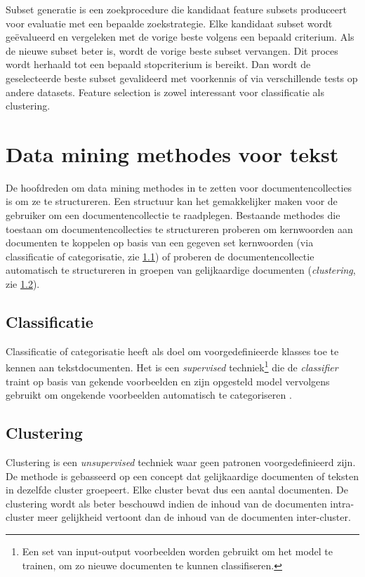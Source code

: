 Subset generatie is een zoekprocedure die kandidaat feature subsets produceert voor evaluatie met een bepaalde zoekstrategie. Elke kandidaat subset wordt ge\"evalueerd en vergeleken met de vorige beste volgens een bepaald criterium. Als de nieuwe subset beter is, wordt de vorige beste subset vervangen. Dit proces wordt herhaald tot een bepaald stopcriterium is bereikt. Dan wordt de geselecteerde beste subset gevalideerd met voorkennis of via verschillende tests op andere datasets. Feature selection is zowel interessant voor classificatie als clustering. 


\section{Data mining methodes voor tekst}
De hoofdreden om data mining methodes in te zetten voor documentencollecties is om ze te structureren. Een structuur kan het gemakkelijker maken voor de gebruiker om een documentencollectie te raadplegen. Bestaande methodes die toestaan om documentencollecties te structureren proberen om kernwoorden aan documenten te koppelen op basis van een gegeven set kernwoorden (via classificatie of categorisatie, zie \ref{classificatie}) of proberen de documentencollectie automatisch te structureren in groepen van gelijkaardige documenten (\textit{clustering}, zie \ref{clustering}).


\subsection{Classificatie}\label{classificatie}
Classificatie of categorisatie heeft als doel om voorgedefinieerde klasses toe te kennen aan tekstdocumenten. Het is een \textit{supervised} techniek\footnote{Een set van input-output voorbeelden worden gebruikt om het model te trainen, om zo nieuwe documenten te kunnen classifiseren.} die de \textit{classifier} traint op basis van gekende voorbeelden en zijn opgesteld model vervolgens gebruikt om ongekende voorbeelden automatisch te categoriseren \cite{Nasa2012}. 



\subsection{Clustering}\label{clustering}
Clustering is een \textit{unsupervised} techniek waar geen patronen voorgedefinieerd zijn. De methode is gebasseerd op een concept dat gelijkaardige documenten of teksten in dezelfde cluster groepeert. Elke cluster bevat dus een aantal documenten. De clustering wordt als beter beschouwd indien de inhoud van de documenten intra-cluster meer gelijkheid vertoont dan de inhoud van de documenten inter-cluster.

